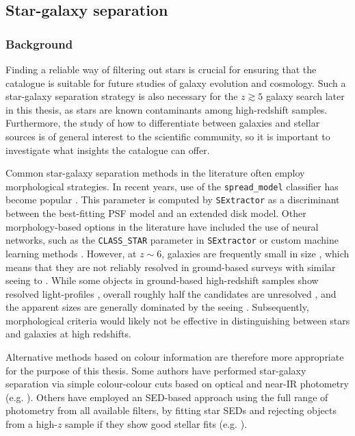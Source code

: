 \subsection{Star-galaxy separation}\label{subsection:star_galaxy}
\subsubsection{Background}\label{subsubsection:star_galaxy_background}
Finding a reliable way of filtering out stars is crucial for ensuring that the \DESVIDEO catalogue is suitable for future studies of galaxy evolution and cosmology. Such a star-galaxy separation strategy is also necessary for the $z\gtrsim5$ galaxy search later in this thesis, as stars are known contaminants among high-redshift samples. Furthermore, the study of how to differentiate between galaxies and stellar sources is of general interest to the scientific community, so it is important to investigate what insights the \DESVIDEO catalogue can offer. \par


Common star-galaxy separation methods in the literature often employ morphological strategies. In recent years, use of the \texttt{spread\_model} classifier has become popular \citep{2012ApJ...757...83D, 2015MNRAS.450..666S, 2015MNRAS.446.2523B}. This parameter is computed by \texttt{SExtractor} as a discriminant between the best-fitting PSF model and an extended disk model. Other morphology-based options in the literature have included the use of neural networks, such as the \texttt{CLASS\_STAR} parameter in \texttt{SExtractor} \citep{2003MNRAS.344..337T,2015A&A...582A..62D,2018MNRAS.481.5451S} or custom machine learning methods \citep{2015MNRAS.450..666S,2018MNRAS.481.5451S}. However, at $z\sim 6$, galaxies are frequently small in size \citep{2012ApJ...744...83O,2016MNRAS.457..440C}, which means that they are not reliably resolved in ground-based surveys with similar seeing to \DESVIDEO. While some objects in ground-based high-redshift samples show resolved light-profiles \citep{2012MNRAS.426.2772B}, overall roughly half the candidates are unresolved \citep{2013AJ....145....4W, 2014MNRAS.440.2810B}, and the apparent sizes are generally dominated by the seeing \citep{2015MNRAS.452.1817B}. Subsequently, morphological criteria would likely not be effective in distinguishing between stars and galaxies at high redshifts. \par

Alternative methods based on colour information are therefore more appropriate for the purpose of this thesis. Some authors have performed star-galaxy separation via simple colour-colour cuts based on optical and near-IR photometry (e.g. \citealt{2010MNRAS.404...86B, 2013MNRAS.428.1281J}). Others have employed an SED-based approach using the full range of photometry from all available filters, by fitting star SEDs and rejecting objects from a high-$z$ sample if they show good stellar fits (e.g. \citealt{2014MNRAS.440.2810B,2015MNRAS.452.1817B}). \par

